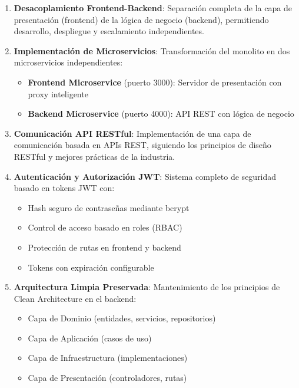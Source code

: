 \documentclass[12pt,a4paper]{article}
\begin{document}
\begin{enumerate}[leftmargin=*]
    \item \textbf{Desacoplamiento Frontend-Backend}: Separación completa de la capa de presentación (frontend) de la lógica de negocio (backend), permitiendo desarrollo, despliegue y escalamiento independientes.

    \item \textbf{Implementación de Microservicios}: Transformación del monolito en dos microservicios independientes:
    \begin{itemize}
        \item \textbf{Frontend Microservice} (puerto 3000): Servidor de presentación con proxy inteligente
        \item \textbf{Backend Microservice} (puerto 4000): API REST con lógica de negocio
    \end{itemize}

    \item \textbf{Comunicación API RESTful}: Implementación de una capa de comunicación basada en APIs REST, siguiendo los principios de diseño RESTful y mejores prácticas de la industria.

    \item \textbf{Autenticación y Autorización JWT}: Sistema completo de seguridad basado en tokens JWT con:
    \begin{itemize}
        \item Hash seguro de contraseñas mediante bcrypt
        \item Control de acceso basado en roles (RBAC)
        \item Protección de rutas en frontend y backend
        \item Tokens con expiración configurable
    \end{itemize}

    \item \textbf{Arquitectura Limpia Preservada}: Mantenimiento de los principios de Clean Architecture en el backend:
    \begin{itemize}
        \item Capa de Dominio (entidades, servicios, repositorios)
        \item Capa de Aplicación (casos de uso)
        \item Capa de Infraestructura (implementaciones)
        \item Capa de Presentación (controladores, rutas)
    \end{itemize}


\end{enumerate}
\end{document}
